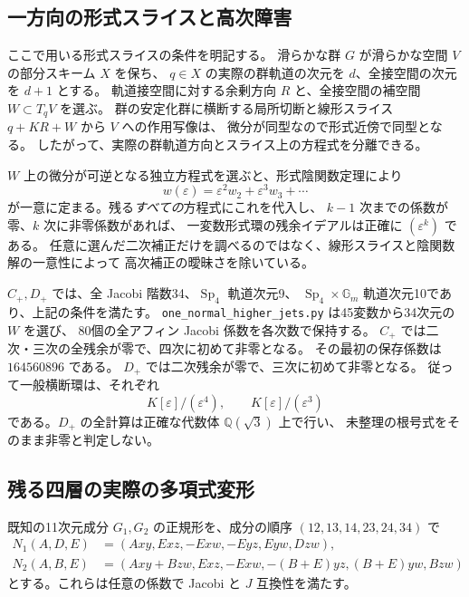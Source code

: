 \subsection{一方向の形式スライスと高次障害}

ここで用いる形式スライスの条件を明記する。
滑らかな群 $G$ が滑らかな空間 $V$ の部分スキーム $X$ を保ち、
$q\in X$ の実際の群軌道の次元を $d$、全接空間の次元を $d+1$ とする。
軌道接空間に対する余剰方向 $R$ と、全接空間の補空間 $W\subset T_qV$ を選ぶ。
群の安定化群に横断する局所切断と線形スライス $q+KR+W$ から $V$ への作用写像は、
微分が同型なので形式近傍で同型となる。
したがって、実際の群軌道方向とスライス上の方程式を分離できる。

$W$ 上の微分が可逆となる独立方程式を選ぶと、形式陰関数定理により
\[
 w(\varepsilon)=\varepsilon^2w_2+\varepsilon^3w_3+\cdots
\]
が一意に定まる。残る\emph{すべての}方程式にこれを代入し、
$k-1$ 次までの係数が零、$k$ 次に非零係数があれば、
一変数形式環の残余イデアルは正確に $(\varepsilon^k)$ である。
任意に選んだ二次補正だけを調べるのではなく、線形スライスと陰関数解の一意性によって
高次補正の曖昧さを除いている。

$C_+,D_+$ では、全 Jacobi 階数34、$\operatorname{Sp}_4$ 軌道次元9、
$\operatorname{Sp}_4\times\mathbb G_m$ 軌道次元10であり、上記の条件を満たす。
\texttt{one\_normal\_higher\_jets.py} は45変数から34次元の $W$ を選び、
80個の全アフィン Jacobi 係数を各次数で保持する。
$C_+$ では二次・三次の全残余が零で、四次に初めて非零となる。
その最初の保存係数は $164560896$ である。
$D_+$ では二次残余が零で、三次に初めて非零となる。
従って一般横断環は、それぞれ
\[
 K[\varepsilon]/(\varepsilon^4),\qquad
 K[\varepsilon]/(\varepsilon^3)
\]
である。$D_+$ の全計算は正確な代数体 $\mathbb Q(\sqrt3)$ 上で行い、
未整理の根号式をそのまま非零と判定しない。

\subsection{残る四層の実際の多項式変形}

既知の11次元成分 $G_1,G_2$ の正規形を、成分の順序 $(12,13,14,23,24,34)$ で
\begin{align*}
 N_1(A,D,E)&=(Axy,Exz,-Exw,-Eyz,Eyw,Dzw),\\
 N_2(A,B,E)&=(Axy+Bzw,Exz,-Exw,-(B+E)yz,(B+E)yw,Bzw)
\end{align*}
とする。これらは任意の係数で Jacobi と $J$ 互換性を満たす。

